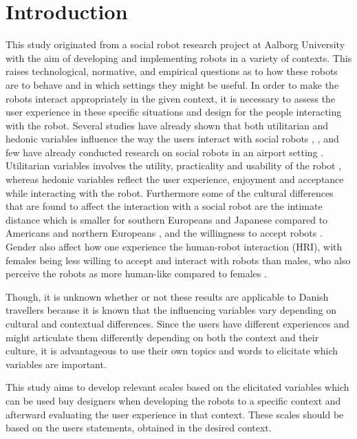 \section{Introduction}
\label{Introduction}
%
This study originated from a social robot research project at Aalborg University with the aim of developing and implementing robots in a variety of contexts. This raises technological, normative, and empirical questions as to how these robots are to behave and in which settings they might be useful. In order to make the robots interact appropriately in the given context, it is necessary to assess the user experience in these specific situations and design for the people interacting with the robot. Several studies have already shown that both utilitarian and hedonic variables influence the way the users interact with social robots \cite{PDF:ExploringInfluencingVariable}, \cite{PDF:SharingALifeHarvey}, and few have already conducted research on social robots in an airport setting \cite{PDF:InvestigatingPositioning}. Utilitarian variables involves the utility, practicality and usability of the robot \cite{PDF:ExploringInfluencingVariable}, whereas hedonic variables reflect the user experience, enjoyment and acceptance while interacting with the robot. Furthermore some of the cultural differences that are found to affect the interaction with a social robot are the intimate distance which is smaller for southern Europeans and Japanese compared to Americans and northern Europeans \cite{PDF:HowMayIServeYou}, and the willingness to accept robots \cite{PDF:InTheCompanyofRobots}. Gender also affect how one experience the human-robot interaction (HRI), with females being less willing to accept and interact with robots than males, who also perceive the robots as more human-like compared to females \cite{PDF:ExploringInfluencingVariable}.

Though, it is unknown whether or not these results are applicable to Danish travellers because it is known that the influencing variables vary depending on cultural and contextual differences. Since the users have different experiences and might articulate them differently depending on both the context and their culture, it is advantageous to use their own topics and words to elicitate which variables are important.

This study aims to develop relevant scales based on the elicitated variables which can be used buy designers when developing the robots to a specific context and afterward evaluating the user experience in that context. These scales should be based on the users statements, obtained in the desired context.



